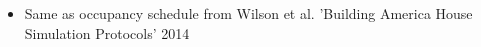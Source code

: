 \begin{itemize}
\item Same as occupancy schedule from Wilson et al. 'Building America House Simulation Protocols' 2014
\end{itemize}
